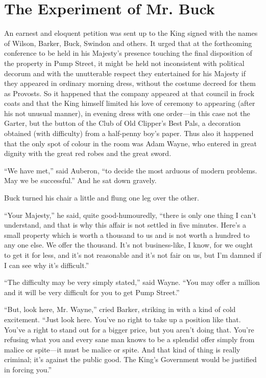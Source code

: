\documentclass{book}
\begin{document}
\chapter{The Experiment of Mr. Buck}
\label{chapter-11}
An earnest and eloquent petition was sent up to the King signed with the names of Wilson, Barker, Buck, Swindon and others. It urged that at the forthcoming conference to be held in his Majesty’s presence touching the final disposition of the property in Pump Street, it might be held not inconsistent with political decorum and with the unutterable respect they entertained for his Majesty if they appeared in ordinary morning dress, without the costume decreed for them as Provosts. So it happened that the company appeared at that council in frock coats and that the King himself limited his love of ceremony to appearing (after his not unusual manner), in evening dress with one order—in this case not the Garter, but the button of the Club of Old Clipper’s Best Pals, a decoration obtained (with difficulty) from a half-penny boy’s paper. Thus also it happened that the only spot of colour in the room was Adam Wayne, who entered in great dignity with the great red robes and the great sword.

“We have met,” said Auberon, “to decide the most arduous of modern problems. May we be successful.” And he sat down gravely.

Buck turned his chair a little and flung one leg over the other.

“Your Majesty,” he said, quite good-humouredly, “there is only one thing I can’t understand, and that is why this affair is not settled in five minutes. Here’s a small property which is worth a thousand to us and is not worth a hundred to any one else. We offer the thousand. It’s not business-like, I know, for we ought to get it for less, and it’s not reasonable and it’s not fair on us, but I’m damned if I can see why it’s difficult.”

“The difficulty may be very simply stated,” said Wayne. “You may offer a million and it will be very difficult for you to get Pump Street.”

“But, look here, Mr. Wayne,” cried Barker, striking in with a kind of cold excitement. “Just look here. You’ve no right to take up a position like that. You’ve a right to stand out for a bigger price, but you aren’t doing that. You’re refusing what you and every sane man knows to be a splendid offer simply from malice or spite—it must be malice or spite. And that kind of thing is really criminal; it’s against the public good. The King’s Government would be justified in forcing you.”
\end{document}
